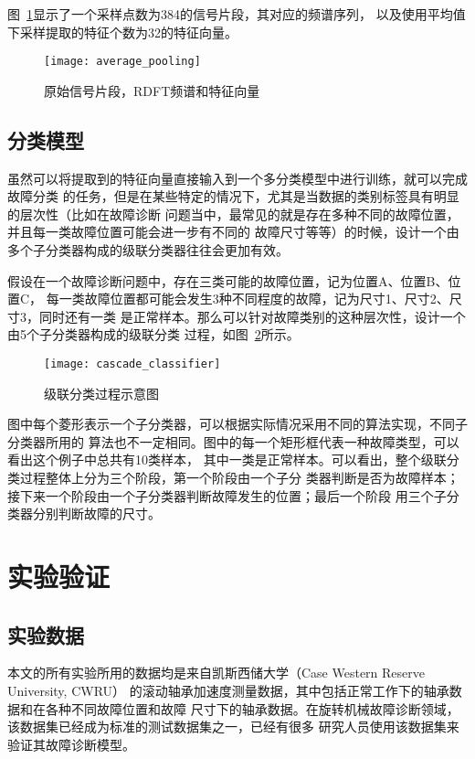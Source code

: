 图~\ref{fig:average_pooling}显示了一个采样点数为384的信号片段，其对应的频谱序列，
以及使用平均值下采样提取的特征个数为32的特征向量。
\begin{figure}[ht] %
  \centering
  \texttt{[image: average\_pooling]}
  \caption{原始信号片段，RDFT频谱和特征向量}
  \label{fig:average_pooling}
\end{figure}

\subsection{分类模型}
\label{subsection:cascade_model}

虽然可以将提取到的特征向量直接输入到一个多分类模型中进行训练，就可以完成故障分类
的任务，但是在某些特定的情况下，尤其是当数据的类别标签具有明显的层次性（比如在故障诊断
问题当中，最常见的就是存在多种不同的故障位置，并且每一类故障位置可能会进一步有不同的
故障尺寸等等）的时候，设计一个由多个子分类器构成的级联分类器往往会更加有效。

假设在一个故障诊断问题中，存在三类可能的故障位置，记为位置A、位置B、位置C，
每一类故障位置都可能会发生3种不同程度的故障，记为尺寸1、尺寸2、尺寸3，同时还有一类
是正常样本。那么可以针对故障类别的这种层次性，设计一个由5个子分类器构成的级联分类
过程，如图~\ref{fig:cascade_classifier}所示。
\begin{figure}[ht] %
  \centering
  \texttt{[image: cascade\_classifier]}
  \caption{级联分类过程示意图}
  \label{fig:cascade_classifier}
\end{figure}

图中每个菱形表示一个子分类器，可以根据实际情况采用不同的算法实现，不同子分类器所用的
算法也不一定相同。图中的每一个矩形框代表一种故障类型，可以看出这个例子中总共有10类样本，
其中一类是正常样本。可以看出，整个级联分类过程整体上分为三个阶段，第一个阶段由一个子分
类器判断是否为故障样本；接下来一个阶段由一个子分类器判断故障发生的位置；最后一个阶段
用三个子分类器分别判断故障的尺寸。

\section{实验验证}

\subsection{实验数据}

本文的所有实验所用的数据均是来自凯斯西储大学（Case Western Reserve University, CWRU）
的滚动轴承加速度测量数据，其中包括正常工作下的轴承数据和在各种不同故障位置和故障
尺寸下的轴承数据。在旋转机械故障诊断领域，该数据集已经成为标准的测试数据集之一，已经有很多
研究人员使用该数据集来验证其故障诊断模型。

